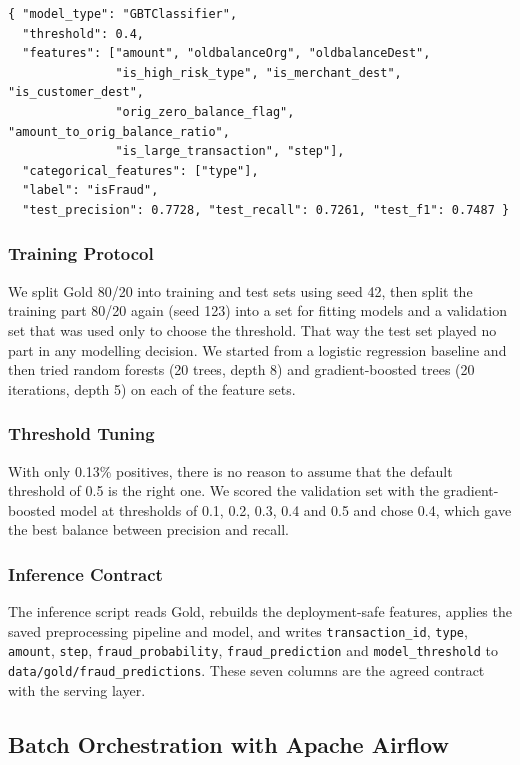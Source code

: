 \documentclass[11pt,a4paper]{article}
\newcommand{\code}[1]{\texttt{#1}}
\begin{document}
\begin{lstlisting}[caption={Configuration of the deployed model (\code{models/member3/model\_config.json})},label={lst:modelconfig}]
{ "model_type": "GBTClassifier",
  "threshold": 0.4,
  "features": ["amount", "oldbalanceOrg", "oldbalanceDest",
               "is_high_risk_type", "is_merchant_dest", "is_customer_dest",
               "orig_zero_balance_flag", "amount_to_orig_balance_ratio",
               "is_large_transaction", "step"],
  "categorical_features": ["type"],
  "label": "isFraud",
  "test_precision": 0.7728, "test_recall": 0.7261, "test_f1": 0.7487 }
\end{lstlisting}

\subsubsection{Training Protocol}
We split Gold 80/20 into training and test sets using seed 42, then split the
training part 80/20 again (seed 123) into a set for fitting models and a
validation set that was used only to choose the threshold. That way the test set
played no part in any modelling decision. We started from a logistic regression
baseline and then tried random forests (20 trees, depth 8) and gradient-boosted
trees (20 iterations, depth 5) on each of the feature sets.

\subsubsection{Threshold Tuning}
With only 0.13\% positives, there is no reason to assume that the default
threshold of 0.5 is the right one. We scored the validation set with the
gradient-boosted model at thresholds of 0.1, 0.2, 0.3, 0.4 and 0.5 and chose 0.4,
which gave the best balance between precision and recall.

\subsubsection{Inference Contract}
The inference script reads Gold, rebuilds the deployment-safe features, applies
the saved preprocessing pipeline and model, and writes \code{transaction\_id},
\code{type}, \code{amount}, \code{step}, \code{fraud\_probability},
\code{fraud\_prediction} and \code{model\_threshold} to
\code{data/gold/fraud\_predictions}. These seven columns are the agreed contract
with the serving layer.

\subsection{Batch Orchestration with Apache Airflow}
\end{document}
